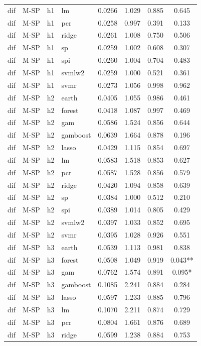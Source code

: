 \begin{ThreePartTable}
\begin{longtable}[t]{llclcccc}
dif & M-SP & h1 & lm & 0.0266 & 1.029 & 0.885 & 0.645\\
dif & M-SP & h1 & pcr & 0.0258 & 0.997 & 0.391 & 0.133\\
dif & M-SP & h1 & ridge & 0.0261 & 1.008 & 0.750 & 0.506\\
dif & M-SP & h1 & sp & 0.0259 & 1.002 & 0.608 & 0.307\\
dif & M-SP & h1 & spi & 0.0260 & 1.004 & 0.704 & 0.483\\
dif & M-SP & h1 & svmlw2 & 0.0259 & 1.000 & 0.521 & 0.361\\
dif & M-SP & h1 & svmr & 0.0273 & 1.056 & 0.998 & 0.962\\
\addlinespace
dif & M-SP & h2 & earth & 0.0405 & 1.055 & 0.986 & 0.461\\
dif & M-SP & h2 & forest & 0.0418 & 1.087 & 0.997 & 0.469\\
dif & M-SP & h2 & gam & 0.0586 & 1.524 & 0.856 & 0.644\\
dif & M-SP & h2 & gamboost & 0.0639 & 1.664 & 0.878 & 0.196\\
dif & M-SP & h2 & lasso & 0.0429 & 1.115 & 0.854 & 0.697\\
dif & M-SP & h2 & lm & 0.0583 & 1.518 & 0.853 & 0.627\\
dif & M-SP & h2 & pcr & 0.0587 & 1.528 & 0.856 & 0.579\\
dif & M-SP & h2 & ridge & 0.0420 & 1.094 & 0.858 & 0.639\\
dif & M-SP & h2 & sp & 0.0384 & 1.000 & 0.512 & 0.210\\
dif & M-SP & h2 & spi & 0.0389 & 1.014 & 0.805 & 0.429\\
dif & M-SP & h2 & svmlw2 & 0.0397 & 1.033 & 0.852 & 0.695\\
dif & M-SP & h2 & svmr & 0.0395 & 1.028 & 0.926 & 0.551\\
\addlinespace
dif & M-SP & h3 & earth & 0.0539 & 1.113 & 0.981 & 0.838\\
dif & M-SP & h3 & forest & 0.0508 & 1.049 & 0.919 & 0.043**\\
dif & M-SP & h3 & gam & 0.0762 & 1.574 & 0.891 & 0.095*\\
dif & M-SP & h3 & gamboost & 0.1085 & 2.241 & 0.884 & 0.284\\
dif & M-SP & h3 & lasso & 0.0597 & 1.233 & 0.885 & 0.796\\
dif & M-SP & h3 & lm & 0.1070 & 2.211 & 0.874 & 0.729\\
dif & M-SP & h3 & pcr & 0.0804 & 1.661 & 0.876 & 0.689\\
dif & M-SP & h3 & ridge & 0.0599 & 1.238 & 0.884 & 0.753\\

\end{longtable}
\end{ThreePartTable}
